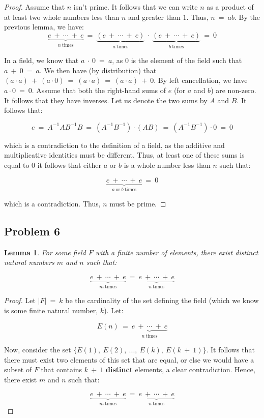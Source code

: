 \documentclass[10pt, oneside]{article}
\newtheorem{lem}{Lemma}
\begin{document}
\begin{proof}
	Assume that $n$ isn't prime. It follows that we can write $n$ as a product of at least two whole numbers 
	less than $n$ and greater than $1$. Thus, $n \ = \ ab$. By the previous lemma, we have:
\newpage	
	$$\underbrace{e \ + \ \cdots \ + \ e}_{n \ \text{times}} \ = \ \underbrace{(e \ + \ \cdots \ + \ e)}_{a \ \text{times}} \ \cdot \ \underbrace{(e \ + \ 
	  \cdots \ + \ e)}_{b \ \text{times}} \ = \ 0$$

  In a field, we know that $a \ \cdot \ 0 \ = \ a$, as $0$ is the element of the field such that $a \ + \ 0 \ = \ a$. We then have (by distribution) that
  $(a \cdot a) \ + \ (a \cdot 0) \ = \ (a \cdot a) \ = \ (a \cdot a) \ + \ 0$. By left cancellation, we have $a \cdot 0 \ = \ 0$. Assume that both the right-hand sums
  of $e$ (for $a$ and $b$) are non-zero. It follows that they have inverses. Let us denote the two sums by $A$ and $B$. It follows that:

  $$e \ = \ A^{-1} A B^{-1} B \ = \ (A^{-1} B^{-1}) \cdot (A B) \ = \ (A^{-1} B^{-1}) \cdot 0 \ = \ 0$$

  which is a contradiction to the definition of a field, as the additive and multiplicative identities must be different. Thus, at least one of these sums is equal to $0$ it follows that either $a$ or $b$ is a whole number
  less than $n$ such that:

  $$\underbrace{e \ + \ \cdots \ + \ e}_{a \ \text{or} \ b \ \text{times}} \ = \ 0$$

  which is a contradiction. Thus, $n$ must be prime.

\end{proof}

\subsection{Problem 6}

\begin{lem}
  For some field $F$ with a finite number of elements, there exist distinct natural numbers $m$ and $n$ such that:

  $$\underbrace{e \ + \ \cdots \ + \ e}_{m \ \text{times}} \ = \ \underbrace{e \ + \ \cdots \ + \ e}_{n \ \text{times}}$$
\end{lem}

\begin{proof}
  Let $|F| \ = \ k$ be the cardinality of the set defining the field (which we know is some finite natural number, $k$). Let:

  $$E(n) \ = \ \underbrace{e \ + \ \cdots \ + \ e}_{n \ \text{times}}$$

  Now, consider the set $\{E(1), \ E(2), \ ..., \ E(k), \ E(k \ + \ 1)\}$. It follows that there must exist two elements of
  this set that are equal, or else we would have a subset of $F$ that contains $k \ + \ 1$ \textbf{distinct} elements, a clear contradiction.
  Hence, there exist $m$ and $n$ such that:

  $$\underbrace{e \ + \ \cdots \ + \ e}_{m \ \text{times}} \ = \ \underbrace{e \ + \ \cdots \ + \ e}_{n \ \text{times}}$$

\end{proof}
\end{document}
